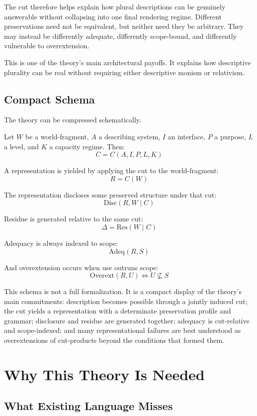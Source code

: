 \documentclass[11pt]{article}
\begin{document}
The cut therefore helps explain how plural descriptions can be genuinely answerable without collapsing into one final rendering regime. Different preservations need not be equivalent, but neither need they be arbitrary. They may instead be differently adequate, differently scope-bound, and differently vulnerable to overextension. \cite{chakravartty_scientific_realism_sep,scientific_pluralism_sep}

This is one of the theory's main architectural payoffs. It explains how descriptive plurality can be real without requiring either descriptive monism or relativism.

\subsection{Compact Schema}

The theory can be compressed schematically.

Let \(W\) be a world-fragment, \(A\) a describing system, \(I\) an interface, \(P\) a purpose, \(L\) a level, and \(K\) a capacity regime. Then:
\[
C = C(A,I,P,L,K)
\]

A representation is yielded by applying the cut to the world-fragment:
\[
R = C(W)
\]

The representation discloses some preserved structure under that cut:
\[
\mathrm{Disc}(R,W \mid C)
\]

Residue is generated relative to the same cut:
\[
\Delta = \mathrm{Res}(W \mid C)
\]

Adequacy is always indexed to scope:
\[
\mathrm{Adeq}(R,S)
\]

And overextension occurs when use outruns scope:
\[
\mathrm{Overext}(R,U) \iff U \not\subseteq S
\]

This schema is not a full formalization. It is a compact display of the theory's main commitments: description becomes possible through a jointly induced cut; the cut yields a representation with a determinate preservation profile and grammar; disclosure and residue are generated together; adequacy is cut-relative and scope-indexed; and many representational failures are best understood as overextensions of cut-products beyond the conditions that formed them.
\section{Why This Theory Is Needed}

\subsection{What Existing Language Misses}
\end{document}
